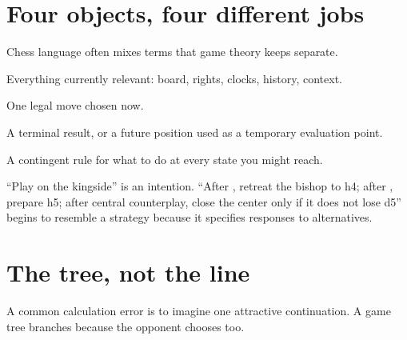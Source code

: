\section{Four objects, four different jobs}
Chess language often mixes terms that game theory keeps separate.

\begin{description}[style=nextline,leftmargin=2.4em,labelsep=.5em]
\item[State.] Everything currently relevant: board, rights, clocks, history, context.
\item[Action.] One legal move chosen now.
\item[Outcome.] A terminal result, or a future position used as a temporary evaluation point.
\item[Strategy.] A contingent rule for what to do at every state you might reach.
\end{description}

``Play on the kingside'' is an intention. ``After , retreat the bishop to h4; after , prepare h5; after central counterplay, close the center only if it does not lose d5'' begins to resemble a strategy because it specifies responses to alternatives.

\section{The tree, not the line}
A common calculation error is to imagine one attractive continuation. A game tree branches because the opponent chooses too.

\begin{center}
\end{center}

